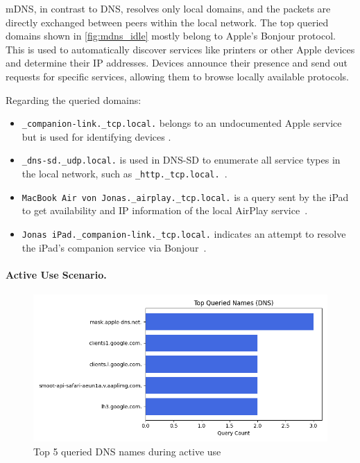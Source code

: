 \documentclass[sigconf,nonacm]{acmart}
\begin{document}
mDNS, in contrast to DNS, resolves only local domains, and the packets are directly exchanged between peers within the local network. The top queried domains shown in \cref{fig:mdns_idle} mostly belong to Apple’s Bonjour protocol. This is used to automatically discover services like printers or other Apple devices and determine their IP addresses. Devices announce their presence and send out requests for specific services, allowing them to browse locally available protocols.

Regarding the queried domains:

\begin{itemize}
    \item \texttt{\_companion-link.\_tcp.local.} belongs to an undocumented Apple service but is used for identifying devices \cite{macpaw_apple_local_network}. 
    \item \texttt{\_dns-sd.\_udp.local.} is used in DNS-SD to enumerate all service types in the local network, such as \texttt{\_http.\_tcp.local.}~\cite{cheshire2005dns}.
    \item \texttt{MacBook\ Air\ von\ Jonas.\_airplay.\_tcp.local.} is a query sent by the iPad to get availability and IP information of the local AirPlay service~\cite{cheshire2005dns}.
    \item \texttt{Jonas\ iPad.\_companion-link.\_tcp.local.} indicates an attempt to resolve the iPad’s companion service via Bonjour~\cite{macpaw_apple_local_network}.
\end{itemize}

\paragraph{Active Use Scenario.}

\begin{figure}[htbp]
    \centering
    \includegraphics[width=\columnwidth]{images/part2/active use/top_queried_names_dns.png}
    \caption{Top 5 queried DNS names during active use}
    \label{fig:dns_active}
\end{figure}
\end{document}

